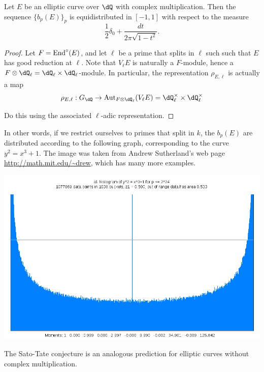 \begin{theorem}\label{thm:deuring-hecke}
Let $E$ be an elliptic curve over $\dQ$ with complex multiplication. Then the 
sequence $\{b_p(E)\}_p$ is equidistributed in $[-1,1]$ with respect to 
the  measure 
\[
  \frac 1 2 \delta_0 + \frac{dt}{2\pi \sqrt{1-t^2}} \text{.}
\]
\end{theorem}
\begin{proof}
Let $F=\operatorname{End}^\circ(E)$, and let $\ell$ be a prime that splits in $\ell$ such 
such that $E$ has good reduction at $\ell$. Note that $V_\ell E$ is naturally 
a $F$-module, hence a $F\otimes\dQ_\ell = \dQ_\ell\times \dQ_\ell$-module. In 
particular, the representation $\rho_{E,\ell}$ is actually a map 
\[
  \rho_{E,\ell}:G_\dQ \to \aut_{F\otimes\dQ_\ell}(V_\ell E) = \dQ_\ell^\times\times\dQ_\ell^\times
\]

Do this using the associated $\ell$-adic representation. 
\end{proof}
In other words, if we restrict ourselves to primes that split in $k$, the 
$b_p(E)$ are distributed according to the following graph, corresponding 
to the curve $y^2=x^3+1$. The image was taken from Andrew Sutherland's 
web page \url{http://math.mit.edu/~drew}, which has many more examples. 

\begin{center}
  \includegraphics[scale=.3]{plots/Sato-Tate_CM.png}
\end{center}

The Sato-Tate conjecture is an analogous prediction for elliptic curves 
without complex multiplication. 

